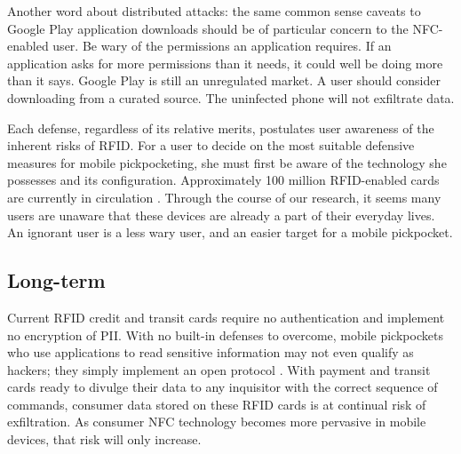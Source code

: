 \documentclass{IEEEtran}
\begin{document}
Another word about distributed attacks: the same common sense caveats to Google Play application downloads should be of particular concern to the NFC-enabled user.  Be wary of the permissions an application requires.  If an application asks for more permissions than it needs, it could well be doing more than it says.  Google Play is still an unregulated market.  A user should consider downloading from a curated source.  The uninfected phone will not exfiltrate data.  

Each defense, regardless of its relative merits, postulates user awareness of the inherent risks of RFID.  For a user to decide on the most suitable defensive measures for mobile pickpocketing, she must first be aware of the technology she possesses and its configuration.  Approximately 100 million RFID-enabled cards are currently in circulation \cite{forbes-1}.  Through the course of our research, it seems many users are unaware that these devices are already a part of their everyday lives.  An ignorant user is a less wary user, and an easier target for a mobile pickpocket.

\subsection{Long-term}
Current RFID credit and transit cards require no authentication and implement no encryption of PII.  With no built-in defenses to overcome, mobile pickpockets who use applications to read sensitive information may not even qualify as hackers; they simply implement an open protocol \cite{bt-hacking-nfc-ccs}.  With payment and transit cards ready to divulge their data to any inquisitor with the correct sequence of commands, consumer data stored on these RFID cards is at continual risk of exfiltration.  As consumer NFC technology becomes more pervasive in mobile devices, that risk will only increase.
\end{document}
